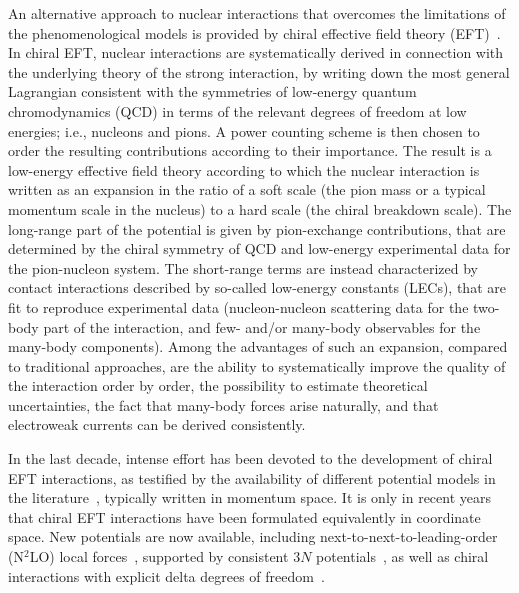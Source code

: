 \documentclass[aps,prc,twocolumn,superscriptaddress,floatfix]{revtex4-1}
\begin{document}
An alternative approach to nuclear interactions that overcomes the limitations
of the phenomenological models is provided by chiral effective field theory 
(EFT)~\cite{Epelbaum:2009,Machleidt:2011}.
In chiral EFT, nuclear interactions are systematically derived in connection with 
the underlying theory of the strong interaction, by writing down the most general 
Lagrangian consistent with the symmetries of low-energy quantum chromodynamics
(QCD) in terms of the relevant degrees of freedom at low energies; i.e., nucleons and pions.
A power counting scheme is then chosen to order the resulting contributions according 
to their importance. The result is a low-energy effective field theory according
to which the nuclear interaction is written as an expansion in the ratio of a 
soft scale (the pion mass or a typical momentum scale in the nucleus) to a
hard scale (the chiral breakdown scale). The long-range part of the potential
is given by pion-exchange contributions, that are determined by the chiral symmetry
of QCD and low-energy experimental data for the pion-nucleon system.
The short-range terms are instead characterized by contact
interactions described by so-called low-energy constants (LECs), 
that are fit to reproduce experimental data (nucleon-nucleon scattering data for 
the two-body part of the interaction, and few- and/or many-body observables for 
the many-body components). 
Among the advantages of such an 
expansion, compared to traditional approaches, are the ability to 
systematically improve the quality of the interaction order by order, 
the possibility to estimate theoretical uncertainties, the fact that
many-body forces arise naturally, and that electroweak currents can 
be derived consistently.

In the last decade, intense effort has been devoted to the 
development of chiral EFT interactions, as testified by the 
availability of different potential models in the 
literature~\cite{Epelbaum:2009,Machleidt:2011,Ekstrom:2013,Entem:2015,
Epelbaum:2015,Ekstrom:2015,Ekstrom:2017}, typically written in momentum 
space. It is only in recent
years that chiral EFT interactions have been formulated equivalently 
in coordinate space. New potentials are now available, including 
next-to-next-to-leading-order (N$^2$LO) local 
forces~\cite{Gezerlis:2013,Gezerlis:2014}, supported by consistent
$3N$ potentials~\cite{Tews:2016,Lynn:2016}, as
well as chiral interactions with explicit delta degrees of
freedom~\cite{Piarulli:2015,Piarulli:2016,Piarulli:2018,Ekstrom:2017}.
\end{document}
